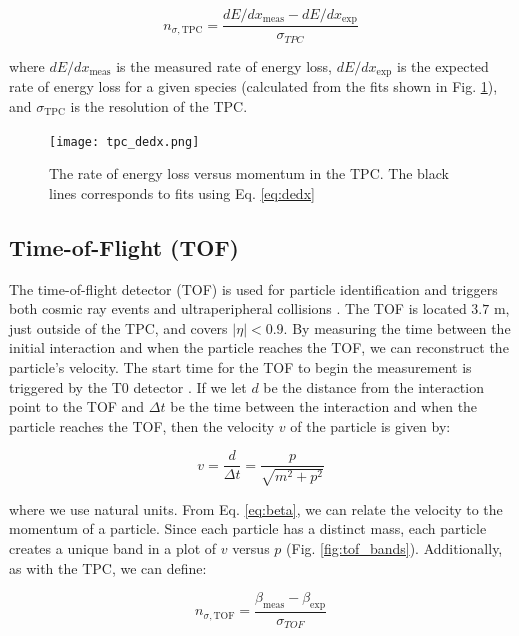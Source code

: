\documentclass[../main.tex]{subfiles}
\begin{document}
\begin{equation}
    n_{\sigma, \text{TPC}} = \frac{dE/dx_{\text{meas}} - dE/dx_{\text{exp}}}{\sigma_{TPC}}
\end{equation}

where $dE/dx_{\text{meas}}$ is the measured rate of energy loss, $dE/dx_{\text{exp}}$ is the expected rate of energy loss for a given species (calculated from the fits shown in Fig. \ref{fig:dedx_tpc}), and $\sigma_{\text{TPC}}$ is the resolution of the TPC. 


\begin{figure}[h]
    \centering
    \texttt{[image: tpc\_dedx.png]} 
    \caption{The rate of energy loss versus momentum in the TPC. The black lines corresponds to fits using Eq. \ref{eq:dedx}}
    \label{fig:dedx_tpc}
\end{figure}

\subsection{Time-of-Flight (TOF)}

The time-of-flight detector (TOF) is used for particle identification and triggers both cosmic ray events and ultraperipheral collisions \cite{Carnesecchi:2018oss}. The TOF is located $3.7$ m, just outside of the TPC, and covers $|\eta|<0.9$. By measuring the time between the initial interaction and when the particle reaches the TOF, we can reconstruct the particle's velocity. The start time for the TOF to begin the measurement is triggered by the T$0$ detector \cite{ALICE:performance}. If we let $d$ be the distance from the interaction point to the TOF and $\Delta t$ be the time between the interaction and when the particle reaches the TOF, then the velocity $v$ of the particle is given by:

\begin{equation}
    v = \frac{d}{\Delta t} = \frac{p}{\sqrt{m^2 + p^2}}
\end{equation}

where we use natural units. From Eq. \ref{eq:beta}, we can relate the velocity to the momentum of a particle. Since each particle has a distinct mass, each particle creates a unique band in a plot of $v$ versus $p$ (Fig. \ref{fig:tof_bands}). Additionally, as with the TPC, we can define:

\begin{equation}
    n_{\sigma, \text{TOF}} = \frac{\beta_{\text{meas}} - \beta_{\text{exp}}}{\sigma_{TOF}}
\end{equation}
\end{document}
